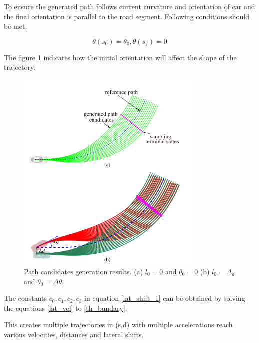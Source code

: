 To ensure the generated path follows current curvature and orientation of car and the final orientation is parallel to the road segment. Following conditions should be met.


\begin{equation}
\theta(s_0) = \theta_0 , \theta(s_f) = 0
\label{th_bundary}
\end{equation}

The figure \ref{lat_planning} indicates how the initial orientation will affect the shape of the trajectory. 

 \begin{figure}[H]
    \centering
    \includegraphics[width=0.8\textwidth]{Images/lateral_planning.png}
    \caption{Path candidates generation results. (a) $l_0 = 0$ and $\theta_0 = 0$ (b) $ 
l_0 = \Delta_d$ and $ \theta_0 = \Delta\theta$.}
    \label{lat_planning}
\end{figure}



The constants $ { c_0,c_1,c_2,c_3}  $ in equation \ref{lat_shift_1} can be obtained by solving the equations \ref{lat_vel} to \ref{th_bundary}.

This creates multiple trajectories in (s,d) with multiple accelerations reach various velocities, distances and lateral shifts. 


